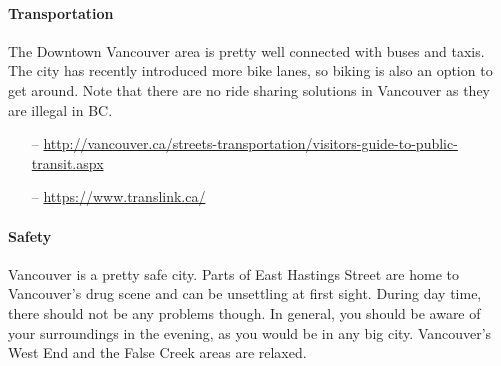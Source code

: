 \paragraph{Transportation}
The Downtown Vancouver area is pretty well connected with buses and taxis. The city has recently introduced more bike lanes, so biking is also an option to get around. Note that there are no ride sharing solutions in Vancouver as they are illegal in BC.
%
\begin{itemize}
\item[--]\url{http://vancouver.ca/streets-transportation/visitors-guide-to-public-transit.aspx}
\item[--]\url{https://www.translink.ca/}
\end{itemize}

\paragraph{Safety}
Vancouver is a pretty safe city. Parts of East Hastings Street are home to Vancouver's drug scene and can be unsettling at first sight. During day time, there should not be any problems though. In general, you should be aware of your surroundings in the evening, as you would be in any big city. Vancouver's West End and the False Creek areas are relaxed.
